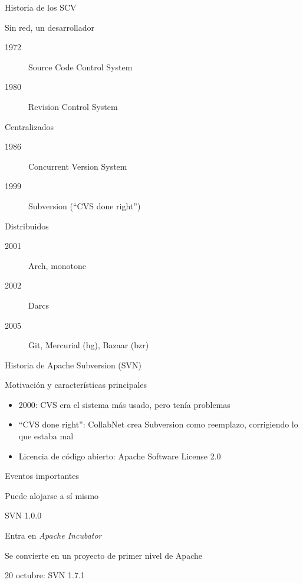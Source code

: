\documentclass[xcolor=svgnames]{beamer}
\begin{document}
\begin{frame}{Historia de los SCV}

  \begin{block}{Sin red, un desarrollador}
    \begin{description}
    \item[1972] Source Code Control System
    \item[1980] Revision Control System
    \end{description}
  \end{block}

  \begin{block}{Centralizados}
    \begin{description}
    \item[1986] Concurrent Version System
    \item[1999] Subversion (\enquote{CVS done right})
    \end{description}
  \end{block}

  \begin{block}{Distribuidos}
    \begin{description}
    \item[2001] Arch, monotone
    \item[2002] Darcs
    \item[2005] Git, Mercurial (hg), Bazaar (bzr)
    \end{description}
  \end{block}

\end{frame}

\begin{frame}{Historia de Apache Subversion (SVN)}

  \begin{block}{Motivación y características principales}
    \begin{itemize}
    \item 2000: CVS era el sistema más usado, pero tenía problemas
    \item ``CVS done right'': CollabNet crea Subversion como
      reemplazo, corrigiendo lo que estaba mal
    \item Licencia de código abierto: Apache Software License 2.0
    \end{itemize}
  \end{block}

  \begin{block}{Eventos importantes}
    \begin{description}[2001]
    \item[2001] Puede alojarse a sí mismo
    \item[2004] SVN 1.0.0
    \item[2009] Entra en \emph{Apache Incubator}
    \item[2010] Se convierte en un proyecto de primer nivel de Apache
    \item[2011] 20 octubre: SVN 1.7.1
    \end{description}
  \end{block}

\end{frame}
\end{document}
